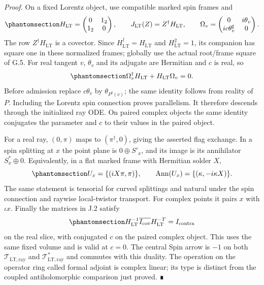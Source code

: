 \documentclass[
  english,
  11pt,
  reqno]{amsart}
\begin{document}
\emph{Proof.} On a fixed Lorentz object, use compatible marked spin
frames and
\begin{equation}\protect\phantomsection\label{eq:gg-ward-hermitian-duality-matrix}{
 H_{\mathrm{LT}}=\begin{pmatrix}0&1_2\\1_2&0\end{pmatrix},\qquad
 J_{\mathrm{LT}}(Z)=Z^\dagger H_{\mathrm{LT}},\qquad
 \Omega_v=\begin{pmatrix}0&i\theta_v\\ic\theta_v^\sharp&0\end{pmatrix}.
}\end{equation} The row \(Z^\dagger H_{\mathrm{LT}}\) is a covector.
Since \(H_{\mathrm{LT}}^\dagger=H_{\mathrm{LT}}\) and
\(H_{\mathrm{LT}}^2=1\), its companion has square one in these
normalized frames; globally use the actual root/frame square of G.5. For
real tangent \(v\), \(\theta_v\) and its adjugate are Hermitian and
\(c\) is real, so
\begin{equation}\protect\phantomsection\label{eq:gg-ward-duality-connection}{
 \Omega_v^\dagger H_{\mathrm{LT}}+H_{\mathrm{LT}}\Omega_v=0.
}\end{equation} Before admission replace \(c\theta_v\) by
\(\theta_{P^\sharp(v)}\); the same identity follows from reality of
\(P\). Including the Lorentz spin connection proves parallelism. It
therefore descends through the initialized ray ODE. On paired complex
objects the same identity conjugates the parameter and \(c\) to their
values in the paired object.

For a real ray, \((0,\pi)\) maps to \((\pi^\dagger,0)\), giving the
asserted flag exchange. In a spin splitting at \(x\) the point plane is
\(0\oplus S'_x\), and its image is its annihilator \(S_x^*\oplus0\).
Equivalently, in a flat marked frame with Hermitian solder \(X\),
\begin{equation}\protect\phantomsection\label{eq:gg-ward-point-plane-duality}{
 U_x=\{(iX\pi,\pi)\},\qquad
 \operatorname{Ann}(U_x)=\{(\kappa,-i\kappa X)\}.
}\end{equation} The same statement is tensorial for curved splittings
and natural under the spin connection and raywise local-twistor
transport. For complex points it pairs \(x\) with \(\iota x\). Finally
the matrices in J.2 satisfy
\begin{equation}\protect\phantomsection\label{eq:gg-ward-infinity-duality}{
 H_{\mathrm{LT}}^{-1}\overline{I_{\mathrm{cov}}}H_{\mathrm{LT}}^{-T}
       =I_{\mathrm{contra}}
}\end{equation} on the real slice, with conjugated \(c\) on the paired
complex object. This uses the same fixed volume and is valid at \(c=0\).
The central Spin arrow is \(-1\) on both
\(\mathcal T_{\mathrm{LT,ray}}\) and \(\mathcal T_{\mathrm{LT,ray}}^*\)
and commutes with this duality. The operation on the operator ring
called formal adjoint is complex linear; its type is distinct from the
coupled antiholomorphic comparison just proved. ∎
\end{document}
